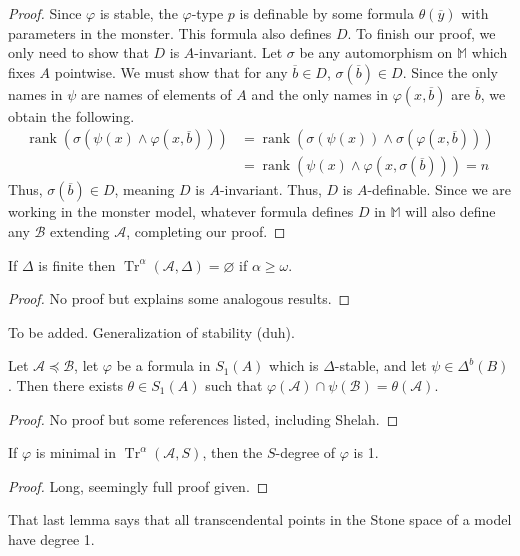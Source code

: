 \documentclass{article}
\newcommand\monster{\mathbb{M}}
\DeclareMathOperator{\Tr}{Tr}
\DeclareMathOperator{\rank}{rank}
\let\mc\mathcal
\begin{document}
\begin{proof}
    Since $\varphi$ is stable, the $\varphi$-type $p$ is definable by some formula $\theta(\overline{y})$ with parameters in the monster. This formula also defines $D$. To finish our proof, we only need to show that $D$ is $A$-invariant. Let $\sigma$ be any automorphism on $\monster$ which fixes $A$ pointwise. We must show that for any $\overline{b} \in D$, $\sigma(\overline{b}) \in D$. Since the only names in $\psi$ are names of elements of $A$ and the only names in $\varphi(x, \overline{b})$ are $\overline{b}$, we obtain the following.
    \begin{align*}
        \rank(\sigma(\psi(x) \land \varphi(x, \overline{b}))) &=
        \rank(\sigma(\psi(x)) \land \sigma(\varphi(x, \overline{b}))) \\ &=
        \rank(\psi(x) \land \varphi(x, \sigma(\overline{b}))) = n
    \end{align*}
    Thus, $\sigma(\overline{b}) \in D$, meaning $D$ is $A$-invariant. Thus, $D$ is $A$-definable. Since we are working in the monster model, whatever formula defines $D$ in $\monster$ will also define any $\mc{B}$ extending $\mc{A}$, completing our proof.
\end{proof}

\begin{lemma}
    If $\Delta$ is finite then $\Tr^{\alpha}(\mc{A}, \Delta) = \varnothing$ if $\alpha \geq \omega$.
\end{lemma}
\begin{proof}
    No proof but explains some analogous results.
\end{proof}

\begin{definition}
    To be added. Generalization of stability (duh).
\end{definition}

\begin{lemma}
    Let $\mc{A} \preceq \mc{B}$, let $\varphi$ be a formula in $S_1(A)$ which is $\Delta$-stable, and let $\psi \in \Delta^b(B)$. Then there exists $\theta \in S_1(A)$ such that $\varphi(\mc{A}) \cap \psi(\mc{B}) = \theta(\mc{A})$.
\end{lemma}
\begin{proof}
    No proof but some references listed, including Shelah.
\end{proof}

\begin{lemma}
    If $\varphi$ is minimal in $\Tr^{\alpha}(\mc{A}, S)$, then the $S$-degree of $\varphi$ is 1.
\end{lemma}
\begin{proof}
    Long, seemingly full proof given.
\end{proof}
That last lemma says that all transcendental points in the Stone space of a model have degree 1.
\end{document}
